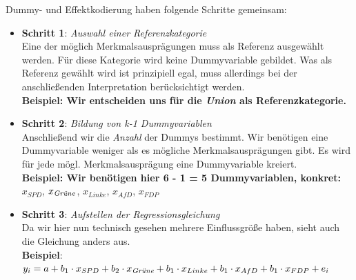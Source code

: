 \documentclass[a4paper]{article}
\begin{document}
\noindent Dummy- und Effektkodierung haben folgende Schritte gemeinsam:
\begin{itemize}
    \item[] \textbf{Schritt 1}: \textit{Auswahl einer Referenzkategorie}\\
            Eine der möglich Merkmalsausprägungen muss als Referenz ausgewählt werden. Für diese Kategorie wird keine Dummyvariable gebildet. Was als Referenz gewählt wird ist prinzipiell egal, muss allerdings bei der anschließenden Interpretation berücksichtigt werden.\\
            \textbf{Beispiel: Wir entscheiden uns für die \textit{Union} als Referenzkategorie.}
    \item[] \textbf{Schritt 2}: \textit{Bildung von k-1 Dummyvariablen}\\
            Anschließend wir die \textit{Anzahl} der Dummys bestimmt. Wir benötigen eine Dummyvariable weniger als es mögliche Merkmalsausprägungen gibt. Es wird für jede mögl. Merkmalsausprägung eine Dummyvariable kreiert.\\
            \textbf{Beispiel: Wir benötigen hier 6 - 1 = 5 Dummyvariablen, konkret:}\\$x_{SPD}$,\; $x_{\mbox{\it \scriptsize Grüne}}$,\; $x_{Linke}$,\; $x_{AfD}$,\; $x_{FDP}$
    \item[] \textbf{Schritt 3}: \textit{Aufstellen der Regressionsgleichung}\\
            Da wir hier nun technisch gesehen mehrere Einflussgröße haben, sieht auch die Gleichung anders aus.\\
            \textbf{Beispiel}: $y_i = a + b_1 \cdot x_{SPD} + b_2 \cdot x_{\mbox{\it \scriptsize Grüne}} + b_1 \cdot x_{Linke} + b_1 \cdot x_{AfD} + b_1 \cdot x_{FDP} + e_i$
\end{itemize}
\end{document}
